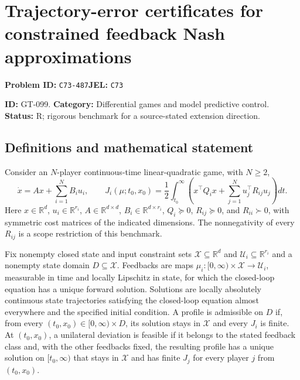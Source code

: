 \documentclass[11pt,a4paper]{article}
\begin{document}
\section*{Trajectory-error certificates for constrained feedback Nash approximations}
\textbf{Problem ID:} \texttt{C73-487}\quad \textbf{JEL:} \texttt{C73}\par
\label{problem:OP-0229}
\label{game:GT-099}
{\sffamily\small\color{muted}
\noindent\textbf{ID:} GT-099. \textbf{Category:} Differential games and model predictive control.
\textbf{Status:} R; rigorous benchmark for a source-stated extension direction.
\par}
\subsection*{Definitions and mathematical statement}
Consider an $N$-player continuous-time linear-quadratic game, with $N\geq2$,
\[
 \dot x=Ax+\sum_{i=1}^N B_i u_i,\qquad
 J_i(\mu;t_0,x_0)=\frac12\int_{t_0}^\infty
       \left(x^\top Q_i x+\sum_{j=1}^N u_j^\top R_{ij}u_j\right)dt.
\]
Here $x\in\mathbb R^d$, $u_i\in\mathbb R^{r_i}$,
$A\in\mathbb R^{d\times d}$, $B_i\in\mathbb R^{d\times r_i}$,
$Q_i\succeq0$, $R_{ij}\succeq0$, and $R_{ii}\succ0$, with symmetric cost matrices of the indicated dimensions. The nonnegativity of every $R_{ij}$ is a scope restriction of this benchmark.

Fix nonempty closed state and input constraint sets $\mathcal X\subseteq\mathbb R^d$ and $\mathcal U_i\subseteq\mathbb R^{r_i}$ and a nonempty state domain $D\subseteq\mathcal X$. Feedbacks are maps $\mu_i:[0,\infty)\times\mathcal X\to\mathcal U_i$, measurable in time and locally Lipschitz in state, for which the closed-loop equation has a unique forward solution. Solutions are locally absolutely continuous state trajectories satisfying the closed-loop equation almost everywhere and the specified initial condition. A profile is admissible on $D$ if, from every $(t_0,x_0)\in[0,\infty)\times D$, its solution stays in $\mathcal X$ and every $J_i$ is finite. At $(t_0,x_0)$, a unilateral deviation is feasible if it belongs to the stated feedback class and, with the other feedbacks fixed, the resulting profile has a unique solution on $[t_0,\infty)$ that stays in $\mathcal X$ and has finite $J_j$ for every player $j$ from $(t_0,x_0)$.
\end{document}
